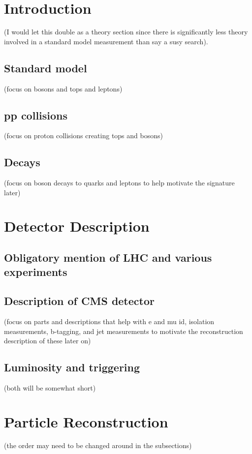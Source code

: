 \documentclass[12pt,chapterheads,oneside]{ucsd}
\begin{document}
\graphicspath{
{figs/}
}




\chapter{Introduction}     
	(I would let this double as a theory section since there is significantly less theory involved in a standard model measurement than say a susy search).
	\section{Standard model}
		(focus on bosons and tops and leptons)
	\section{pp collisions}          
		(focus on proton collisions creating tops and bosons)
	\section{Decays}
    		(focus on boson decays to quarks and leptons to help motivate the signature later)

\chapter{Detector Description}
	\section{Obligatory mention of LHC and various experiments}
	\section{Description of CMS detector}        
		(focus on parts and descriptions that help with e and mu id, isolation measurements, b-tagging, and jet measurements to motivate the reconstruction description of these later on)
	\section{Luminosity and triggering}        
		(both will be somewhat short)

\chapter{Particle Reconstruction}
                (the order may need to be changed around in the subsections)
\end{document}
